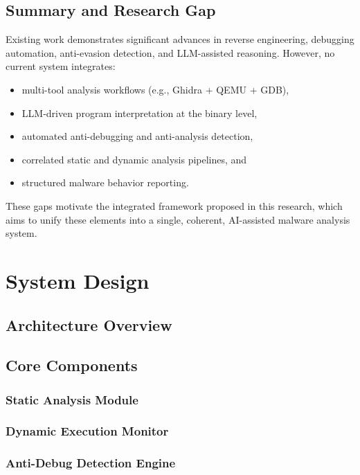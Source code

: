 \documentclass[conference]{IEEEtran}
\begin{document}
\subsection{Summary and Research Gap}

Existing work demonstrates significant advances in reverse engineering, debugging automation, anti-evasion detection, and LLM-assisted reasoning. However, no current system integrates:

\begin{itemize}
    \item multi-tool analysis workflows (e.g., Ghidra + QEMU + GDB),
    \item LLM-driven program interpretation at the binary level,
    \item automated anti-debugging and anti-analysis detection,
    \item correlated static and dynamic analysis pipelines, and
    \item structured malware behavior reporting.
\end{itemize}

These gaps motivate the integrated framework proposed in this research, which aims to unify these elements into a single, coherent, AI-assisted malware analysis system.


\section{System Design}

\subsection{Architecture Overview}

\subsection{Core Components}
\subsubsection{Static Analysis Module}
\subsubsection{Dynamic Execution Monitor}
\subsubsection{Anti-Debug Detection Engine}
\end{document}

